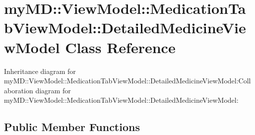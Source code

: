 \hypertarget{classmy_m_d_1_1_view_model_1_1_medication_tab_view_model_1_1_detailed_medicine_view_model}{
\section{my\-MD::View\-Model::Medication\-Tab\-View\-Model::Detailed\-Medicine\-View\-Model Class Reference}
\label{d7/d4b/classmy_m_d_1_1_view_model_1_1_medication_tab_view_model_1_1_detailed_medicine_view_model}
}
Inheritance diagram for my\-MD::View\-Model::Medication\-Tab\-View\-Model::Detailed\-Medicine\-View\-Model:Collaboration diagram for my\-MD::View\-Model::Medication\-Tab\-View\-Model::Detailed\-Medicine\-View\-Model:\subsection*{Public Member Functions}

